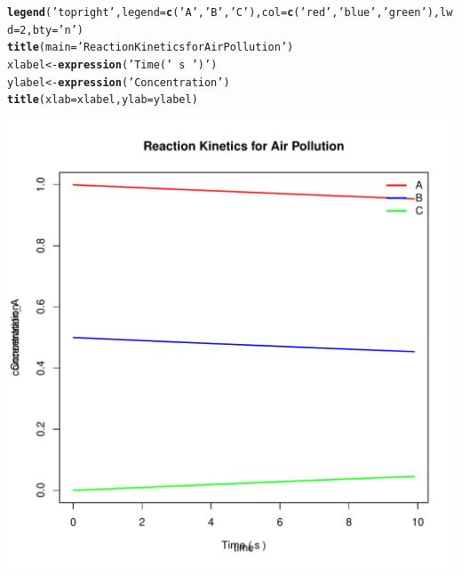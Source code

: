\documentclass{tufte-handout}\usepackage[]{graphicx}\usepackage[]{xcolor}
\makeatletter
\def\maxwidth{ %
  \ifdim\Gin@nat@width>\linewidth
    \linewidth
  \else
    \Gin@nat@width
  \fi
}
\newcommand{\hlnum}[1]{\textcolor[rgb]{0.686,0.059,0.569}{#1}}%
\newcommand{\hlstr}[1]{\textcolor[rgb]{0.192,0.494,0.8}{#1}}%
\newcommand{\hlopt}[1]{\textcolor[rgb]{0,0,0}{#1}}%
\newcommand{\hlstd}[1]{\textcolor[rgb]{0.345,0.345,0.345}{#1}}%
\newcommand{\hlkwb}[1]{\textcolor[rgb]{0.69,0.353,0.396}{#1}}%
\newcommand{\hlkwc}[1]{\textcolor[rgb]{0.333,0.667,0.333}{#1}}%
\newcommand{\hlkwd}[1]{\textcolor[rgb]{0.737,0.353,0.396}{\textbf{#1}}}%
\newenvironment{kframe}{%
 \def\at@end@of@kframe{}%
 \ifinner\ifhmode%
  \def\at@end@of@kframe{\end{minipage}}%
  \begin{minipage}{\columnwidth}%
 \fi\fi%
 \def\FrameCommand##1{\hskip\@totalleftmargin \hskip-\fboxsep
 \colorbox{shadecolor}{##1}\hskip-\fboxsep
     \hskip-\linewidth \hskip-\@totalleftmargin \hskip\columnwidth}%
 \MakeFramed {\advance\hsize-\width
   \@totalleftmargin\z@ \linewidth\hsize
   \@setminipage}}%
 {\par\unskip\endMakeFramed%
 \at@end@of@kframe}
\newenvironment{knitrout}{}{} %
\makeatother
\begin{document}
\begin{knitrout}
\begin{kframe}
\begin{alltt}
\hlkwd{legend}\hlstd{(}\hlstr{'topright'}\hlstd{,} \hlkwc{legend} \hlstd{=} \hlkwd{c}\hlstd{(}\hlstr{'A'}\hlstd{,} \hlstr{'B'}\hlstd{,} \hlstr{'C'}\hlstd{),} \hlkwc{col} \hlstd{=} \hlkwd{c}\hlstd{(}\hlstr{'red'}\hlstd{,} \hlstr{'blue'}\hlstd{,} \hlstr{'green'}\hlstd{),} \hlkwc{lwd} \hlstd{=} \hlnum{2}\hlstd{,} \hlkwc{bty} \hlstd{=} \hlstr{'n'}\hlstd{)}
\hlkwd{title}\hlstd{(}\hlkwc{main} \hlstd{=} \hlstr{'Reaction Kinetics for Air Pollution'}\hlstd{)}
\hlstd{xlabel} \hlkwb{<-} \hlkwd{expression}\hlstd{(}\hlstr{'Time ('} \hlopt{~} \hlstd{s} \hlopt{~} \hlstr{')'}\hlstd{)}
\hlstd{ylabel} \hlkwb{<-} \hlkwd{expression}\hlstd{(}\hlstr{'Concentration'}\hlstd{)}
\hlkwd{title}\hlstd{(}\hlkwc{xlab} \hlstd{= xlabel,} \hlkwc{ylab} \hlstd{= ylabel)}
\end{alltt}
\end{kframe}
\includegraphics[width=\maxwidth]{figure/unnamed-chunk-1-1} 
\end{knitrout}
\end{document}
